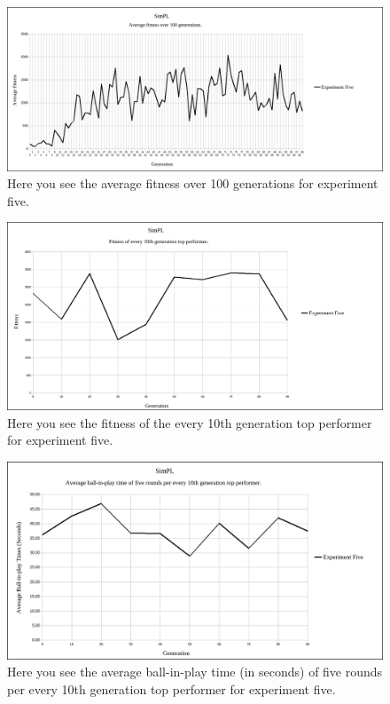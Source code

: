 \documentclass[a4paper,10pt]{article}
\begin{document}
\begin{figure}[H]  
  \centering
  \includegraphics[width=1\textwidth]{figures/exp5_avg_fit.png}
  \caption{Here you see the average fitness over 100 generations for experiment five.}
  \label{fig:exp5_avg_fit}
\end{figure}

\begin{figure}[H]  
  \centering
  \includegraphics[width=1\textwidth]{figures/exp5_10_tops.png}
  \caption{Here you see the fitness of the every 10th generation top performer for experiment five.}
  \label{fig:exp5_10_tops}
\end{figure}

\begin{figure}[H]  
  \centering
  \includegraphics[width=1\textwidth]{figures/exp5_10_tops_times.png}
  \caption{Here you see the average ball-in-play time (in seconds) of five rounds per every 10th generation top performer for experiment five.}
  \label{fig:exp5_10_tops_times}
\end{figure}
\end{document}
